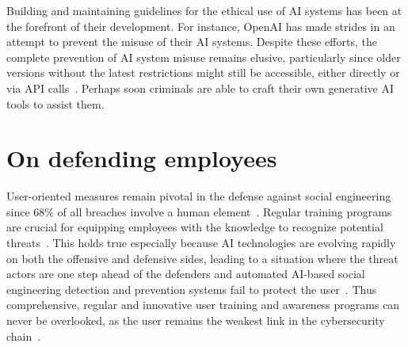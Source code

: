 



Building and maintaining guidelines for the ethical use of AI systems has been at the forefront of their development. For instance, OpenAI has made strides in an attempt to prevent the misuse of their AI systems. Despite these efforts, the complete prevention of AI system misuse remains elusive, particularly since older versions without the latest restrictions might still be accessible, either directly or via API calls~\citep{gupta_From_ChatGPT_to_ThreatGPT_2023}. Perhaps soon criminals are able to craft their own generative AI tools to assist them.

\section{On defending employees}
\begin{comment}
\end{comment}

User-oriented measures remain pivotal in the defense against social engineering since 68\% of all breaches involve a human element~\citep{verizon_Data_Breach_Investigations_Report_2024}. Regular training programs are crucial for equipping employees with the knowledge to recognize potential threats~\citep{hadnagy_Social_Engineering_The_Science_2018}. This holds true especially because AI technologies are evolving rapidly on both the offensive and defensive sides, leading to a situation where the threat actors are one step ahead of the defenders and automated AI-based social engineering detection and prevention systems fail to protect the user~\citep{fakhouri_AI_Driven_Solutions_SE_Attacks_2024}. Thus comprehensive, regular and innovative user training and awareness programs can never be overlooked, as the user remains the weakest link in the cybersecurity chain~\citep{mitnick_The_Art_of_Deception_2003}.

